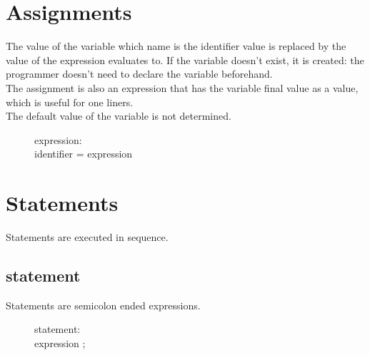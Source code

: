 \documentclass[12pt]{article}
\begin{document}
\section{Assignments}
The value of the variable which name is the identifier value is replaced by the value of the expression
evaluates to. If the variable doesn't exist, it is created: the programmer doesn't need to declare the
variable beforehand.\\
The assignment is also an expression that has the variable final value as a value, which is useful for
one liners.\\
The default value of the variable is not determined.
\begin{description}
  \item[]expression: \hfill \\
    identifier = expression
\end{description}

\section{Statements}
Statements are executed in sequence.

\subsection{statement}
Statements are semicolon ended expressions.
\begin{description}
  \item[]statement: \hfill \\
    expression ;
\end{description}


\end{document}
